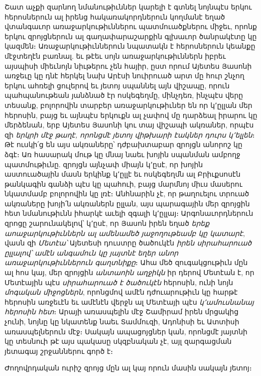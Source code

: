 \documentclass{article}
\begin{document}
{Շատ աչքի զարնող նմանութիւններ կարելի է գտնել նոյնպէս երկու հերոսներուն ալ իրենց հակառակորդներուն կողմանէ եղած վտանգաւոր առաջարկութիւններու պատմուածքներու միջեւ, որոնք երկու զրոյցներուն ալ գաղափարաշարքին գլխաւոր ծանրակէտը կը կազմեն։ Առաջարկութիւններուն նպատակն է հերոսներուն կեանքը մէջտեղէն բառնալ. եւ թէեւ սոյն առաջարկութիւններն իբրեւ այսպիսի միեւնոյն նիւթերու չեն հայիր, ըստ որում Այետես Յասոնի առջեւը կը դնէ հերկել նախ Արէսի նուիրուած արտ մը հուր շնչող երկու ահռելի ցուլերով եւ յետոյ սպաննել այն վիշապը, որուն պահպանութեան յանձնած էր ոսկեգեղմը, մինչդեռ, ինչպէս վերը տեսանք, բոլորովին տարբեր առաջարկութիւներ են որ կ՚ըլլան մեր հերոսին, բայց եւ այնպէս երկուքն ալ չափով մը դարձեալ իրարու կը մերձենան, երբ Այետես Յասոնի կու տայ վիշապի ակռաներ, որպէս զի \emph{երկրի մէջ թաղէ, որոնցմէ յետոյ վիթխարի էակներ դուրս կ՚ելլեն}։ Թէ ուսկի՛ց են այս ակռաները՝ դժբախտաբար զրոյցն անորոշ կը ձգէ։ Առ հասարակ մութ կը մնայ նաեւ խոյին սպանման ամբողջ պատմութիւնը. զրոյցն այնչափ միայն կ՚ըսէ, որ խոյին աստուածային մասն երկինք կ՚ըլլէ եւ ոսկեգեղմն ալ Բրիւքսոսէն թանկագին գանձի պէս կը պահուի, բայց մարմնոյ միւս մասերու նկատմամբ բոլորովին կը լռէ։ Անհնարին չէ, որ թաղուելու տրուած ակռաները խոյի՛ն ակռաներն ըլլան, այս պարագային մեր զրոյցին հետ նմանութիւնն իհարկէ աւելի զգալի կ՚ըլլայ։ Արգոնաւորդներուն զրոցը շարունակելով՝ կ՚ըսէ, որ Յասոն իրեն եղած \emph{երեք աոաջարկութիւններն ալ ամենամեծ յաջողութեամբ կը կատարէ}, վասն զի \emph{Մետէա՝} Այետեսի դուստրը ծածուկէն \emph{իրեն սիրահարուած ըլլալով՝ ամէն անգամուն կը յայտնէ եղեր անոր առաջարկութիւններուն գաղտնիքը}։ Ահա մեծ զուգակցութիւն մըն ալ հոս կայ, մեր զրոյցին \emph{անտաոին աղջիկն} իր դերով Մետէան է, որ Մետէային պէս \emph{սիրահարուած է ծածուկէն} հերոսին, ունի նոյն \emph{մոգական միջոցներն}, որոնցմով ամէն դժուարութիւն կը հարթէ հերոսին առջեւէն եւ ամէնէն վերջն ալ Մետէայի պէս \emph{կ՚ամուսնանայ հերոսին հետ}։ Արայի առասպելին մէջ Շամիրամ իրեն մրցակից չունի, նոյնը կը նկատենք նաեւ Տամմուզի, Ադոնիսի եւ Ատտիսի առասպելներուն մէջ։ Սակայն ապացոյցներ կան, որոնցմէ յայտնի կը տեսնուի թէ այս պակասը սկզբնական չէ, այլ զարգացման յետագայ շրջաններու գործ է։

Ժողովրդական ուրիշ զրոյց մըն ալ կայ որուն մասին սակայն յետոյ։}
\clearpage
\subsection{}
\end{document}
